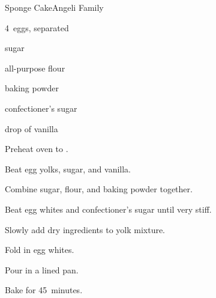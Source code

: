 \begin{recipe}{Sponge Cake}{Angeli Family}{}

\begin{ingredients}
\item 4~eggs, separated
\item {} sugar
\item {} all-purpose flour
\item {} baking powder
\item \tp{\half} confectioner's sugar
\item drop of vanilla
\end{ingredients}

\begin{directions}
\item Preheat oven to .
\item Beat egg yolks, sugar, and vanilla.
\item Combine sugar, flour, and baking powder together.
\item Beat egg whites and confectioner's sugar until very stiff.
\item Slowly add dry ingredients to yolk mixture.
\item Fold in egg whites.
\item Pour in a lined pan.
\item Bake for 45~minutes.
\end{directions}

\end{recipe}
